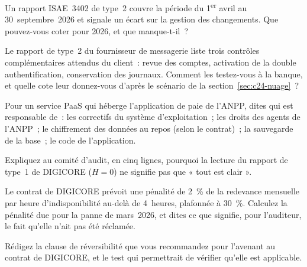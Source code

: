 \begin{boxexo}[title={\ding{45}\quad Exercice~24.3. Type 1 ou type 2 \niveaubase}]
Un rapport ISAE~3402 de type~2 couvre la période du 1\textsuperscript{er}
avril au 30~septembre~2026 et signale un écart sur la gestion des
changements. Que pouvez-vous coter pour 2026, et que manque-t-il~?
\end{boxexo}

\begin{boxexo}[title={\ding{45}\quad Exercice~24.4. Les contrôles complémentaires \niveaumoyen}]
Le rapport de type~2 du fournisseur de messagerie liste trois contrôles
complémentaires attendus du client~: revue des comptes, activation de la
double authentification, conservation des journaux. Comment les testez-vous
à la banque, et quelle cote leur donnez-vous d'après le scénario de la
section~\ref{sec:c24-nuage}~?
\end{boxexo}

\begin{boxexo}[title={\ding{45}\quad Exercice~24.5. Qui est responsable~? \niveaumoyen}]
Pour un service PaaS qui héberge l'application de paie de l'ANPP, dites
qui est responsable de~: les correctifs du système d'exploitation~; les
droits des agents de l'ANPP~; le chiffrement des données au repos (selon le
contrat)~; la sauvegarde de la base~; le code de l'application.
\end{boxexo}

\begin{boxexo}[title={\ding{45}\quad Exercice~24.6. L'ignorance unanime \niveaumoyen}]
Expliquez au comité d'audit, en cinq lignes, pourquoi la lecture du
rapport de type~1 de DIGICORE ($H = 0$) ne signifie pas que « tout est
clair ».
\end{boxexo}

\begin{boxexo}[title={\ding{45}\quad Exercice~24.7. Les pénalités \niveaumoyen}]
Le contrat de DIGICORE prévoit une pénalité de 2~\% de la redevance
mensuelle par heure d'indisponibilité au-delà de 4~heures, plafonnée à
30~\%. Calculez la pénalité due pour la panne de mars~2026, et dites ce que
signifie, pour l'auditeur, le fait qu'elle n'ait pas été réclamée.
\end{boxexo}

\begin{boxexo}[title={\ding{45}\quad Exercice~24.8. La réversibilité \niveaumoyen}]
Rédigez la clause de réversibilité que vous recommandez pour l'avenant au
contrat de DIGICORE, et le test qui permettrait de vérifier qu'elle est
applicable.
\end{boxexo}

